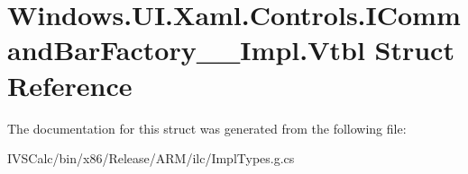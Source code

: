 \hypertarget{struct_windows_1_1_u_i_1_1_xaml_1_1_controls_1_1_i_command_bar_factory_____impl_1_1_vtbl}{}\section{Windows.\+U\+I.\+Xaml.\+Controls.\+I\+Command\+Bar\+Factory\+\_\+\+\_\+\+Impl.\+Vtbl Struct Reference}
\label{struct_windows_1_1_u_i_1_1_xaml_1_1_controls_1_1_i_command_bar_factory_____impl_1_1_vtbl}


The documentation for this struct was generated from the following file\+:\begin{DoxyCompactItemize}
\item 
I\+V\+S\+Calc/bin/x86/\+Release/\+A\+R\+M/ilc/Impl\+Types.\+g.\+cs\end{DoxyCompactItemize}
